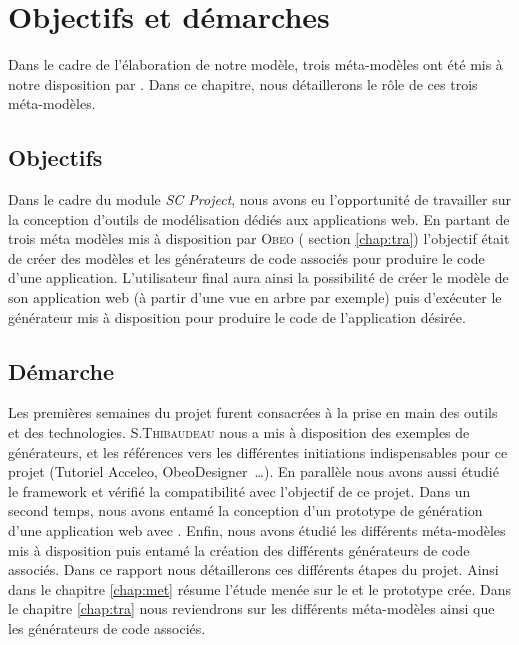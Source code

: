 \chapter{Objectifs et démarches}\label{chap:mod}
Dans le cadre de l'élaboration de notre modèle, trois méta-modèles ont été mis à notre disposition par \kwobeo. Dans ce chapitre, nous détaillerons le rôle de ces trois méta-modèles.


\section{Objectifs}
Dans le cadre du module \emph{SC Project}, nous avons eu l'opportunité de travailler sur la conception d'outils de modélisation dédiés aux applications web. En partant de trois méta modèles mis à disposition par \textsc{Obeo}
(\cf{} section \ref{chap:tra}) l'objectif était de créer des modèles et les générateurs de code associés pour produire le code d'une application. L'utilisateur final aura ainsi la possibilité de créer le modèle de son application web (à partir d'une vue en arbre par exemple) puis d'exécuter le générateur mis à disposition pour produire le code de l'application désirée.



\section{Démarche} 
Les premières semaines du projet furent consacrées à la prise en main des outils et des technologies. S.\textsc{Thibaudeau} nous a mis à disposition des exemples de générateurs, et les références vers les différentes initiations indispensables pour ce projet (Tutoriel Acceleo, ObeoDesigner~\dots). En parallèle nous avons aussi étudié le framework \kwplay{} et vérifié la compatibilité avec l'objectif de ce projet. Dans un second temps, nous avons entamé la conception d'un prototype de génération d'une application web avec \kwplay{}. Enfin, nous avons étudié les différents méta-modèles mis à disposition puis entamé la création des différents générateurs de code associés. Dans ce rapport nous détaillerons ces différents étapes du projet. Ainsi dans le chapitre \ref{chap:met} résume l'étude menée sur le \kwplay{} et le prototype crée. Dans le chapitre \ref{chap:tra} nous reviendrons sur les différents méta-modèles ainsi que les générateurs de code associés. 



